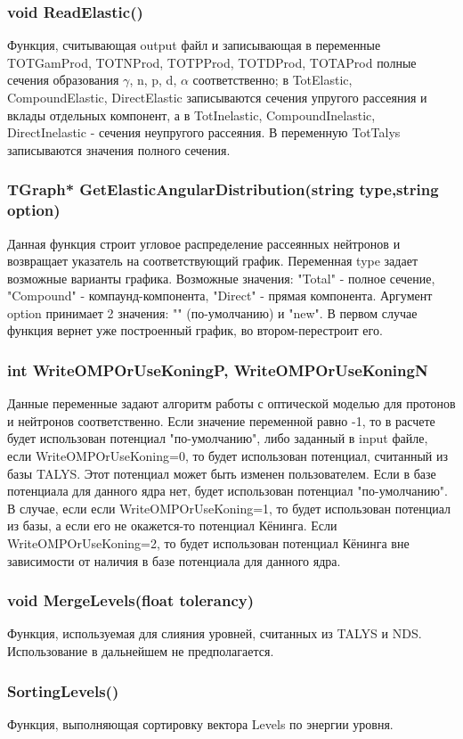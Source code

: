 \documentclass[a4paper,12pt]{extarticle}
\begin{document}
\subsubsection{void ReadElastic()}
Функция, считывающая output файл и записывающая в переменные TOTGamProd, TOTNProd, TOTPProd, TOTDProd, TOTAProd полные сечения образования $\gamma$, n, p, d, $\alpha$ соответственно;  в TotElastic, CompoundElastic, DirectElastic записываются сечения упругого рассеяния и вклады отдельных компонент, а в TotInelastic, CompoundInelastic, DirectInelastic - сечения неупругого рассеяния. В переменную TotTalys записываются значения полного сечения.
\subsubsection{TGraph* GetElasticAngularDistribution(string type,string option)}
Данная функция строит угловое распределение рассеянных нейтронов и возвращает указатель на соответствующий график. Переменная type задает возможные варианты графика. Возможные значения: "Total" - полное сечение, "Compound" - компаунд-компонента, "Direct" - прямая компонента. Аргумент option принимает 2 значения: "" (по-умолчанию) и "new". В первом случае функция вернет уже построенный график, во втором-перестроит его.
\subsubsection{int WriteOMPOrUseKoningP, WriteOMPOrUseKoningN}
Данные переменные задают алгоритм работы с оптической моделью для протонов и нейтронов соответственно. Если значение переменной равно -1, то в расчете будет использован потенциал "по-умолчанию", либо заданный в input файле, если WriteOMPOrUseKoning=0, то будет использован потенциал, считанный из базы TALYS. Этот потенциал может быть изменен пользователем. Если в базе потенциала для данного ядра нет, будет использован потенциал "по-умолчанию". В случае, если если WriteOMPOrUseKoning=1, то будет использован потенциал из базы, а если его не окажется-то потенциал Кёнинга. Если WriteOMPOrUseKoning=2, то будет использован потенциал Кёнинга вне зависимости от наличия в базе потенциала для данного ядра.
\subsubsection{void MergeLevels(float tolerancy)}
Функция, используемая для слияния уровней, считанных из TALYS и NDS. Использование в дальнейшем не предполагается.
\subsubsection{SortingLevels()}
Функция, выполняющая сортировку вектора Levels по энергии уровня. 
\end{document}
